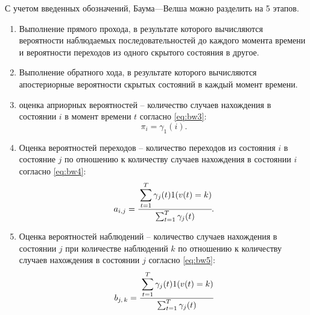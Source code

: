 С учетом введенных обозначений, Баума---Велша можно разделить на 5 этапов.
\begin{enumerate}
	\item Выполнение прямого прохода, в результате которого вычисляются вероятности наблюдаемых последовательностей до каждого момента времени и вероятности переходов из одного скрытого состояния в другое.
	\item Выполнение обратного хода, в результате которого вычисляются апостериорные вероятности скрытых состояний в каждый момент времени.
	\item оценка априорных вероятностей -- количество случаев нахождения в состоянии $i$ в момент времени $t$ согласно \ref{eq:bw3}:
	\begin{equation}\label{eq:bw3}
		\pi_i = \gamma_1(i).
	\end{equation}
	\item  Оценка вероятностей переходов -- количество переходов из состояния  $i$ в состояние $j$ по отношению к количеству случаев нахождения в состоянии $i$ согласно \ref{eq:bw4}:
	\begin{equation}\label{eq:bw4}
		a_{i, j} = \cfrac{\displaystyle\sum_{t=1}^T \gamma_j(t) 1(v(t)=k)}{\sum_{t=1}^T \gamma_j(t)}.
	\end{equation}
	\item Оценка вероятностей наблюдений -- количество случаев нахождения в состоянии $j$ при количестве наблюдений $k$ по отношению к количеству случаев нахождения в состоянии $j$ согласно \ref{eq:bw5}:
	\begin{equation}\label{eq:bw5}
		b_{j,\,k} = \cfrac{\displaystyle\sum_{t=1}^T \gamma_j(t) 1(v(t)=k)}{\sum_{t=1}^T \gamma_j(t) }
	\end{equation}
\end{enumerate}
